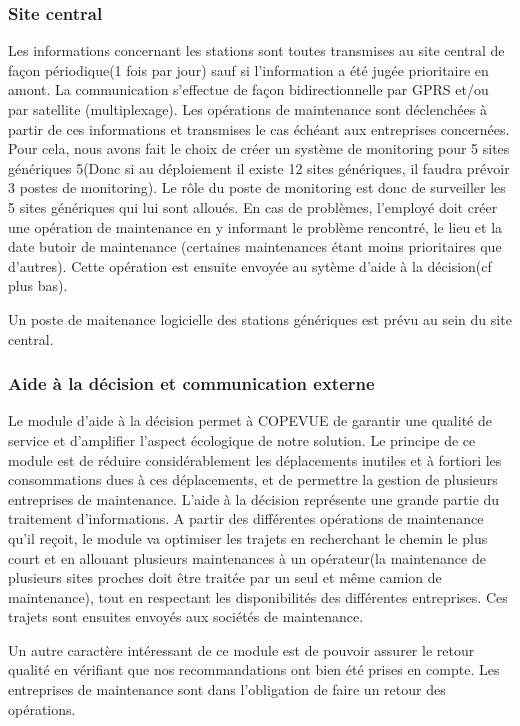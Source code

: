    \subsubsection{Site central}
Les informations concernant les stations sont toutes transmises au site central de façon périodique(1 fois par jour) sauf si l'information a été jugée prioritaire en amont. La communication s'effectue de façon bidirectionnelle par GPRS et/ou par satellite (multiplexage). Les opérations de maintenance sont déclenchées à partir de ces informations et transmises le cas échéant aux entreprises concernées. Pour cela, nous avons fait le choix de créer un système de monitoring pour 5 sites génériques 5(Donc si au déploiement il existe 12 sites génériques, il faudra prévoir 3 postes de monitoring). Le rôle du poste de monitoring est donc de surveiller les 5 sites génériques qui lui sont alloués. En cas de problèmes, l'employé doit créer une opération de maintenance en y informant le problème rencontré, le lieu et la date butoir de maintenance (certaines maintenances étant moins prioritaires que d'autres). Cette opération est ensuite envoyée au sytème d'aide à la décision(cf plus bas). 
\par Un poste de maitenance logicielle des stations génériques est prévu au sein du site central.
    
    
    \subsubsection{Aide à la décision et communication externe}
     Le module d'aide à la décision permet à COPEVUE de garantir une qualité de service et d'amplifier l'aspect écologique de notre solution. Le principe de ce module est de réduire considérablement les déplacements inutiles et à fortiori les consommations dues à ces déplacements, et de permettre la gestion de plusieurs entreprises de maintenance. L'aide à la décision représente une grande partie du traitement d'informations. A partir des différentes opérations de maintenance qu'il reçoit, le module va optimiser les trajets en recherchant le chemin le plus court et en allouant plusieurs maintenances à un opérateur(la maintenance de plusieurs sites proches doit être traitée par un seul et même camion de maintenance), tout en respectant les disponibilités des différentes entreprises. Ces trajets sont ensuites envoyés aux sociétés de maintenance. 
\par Un autre caractère intéressant de ce module est de pouvoir assurer le retour qualité en vérifiant que nos recommandations ont bien été prises en compte. Les entreprises de maintenance sont dans l'obligation de faire un retour des opérations.

